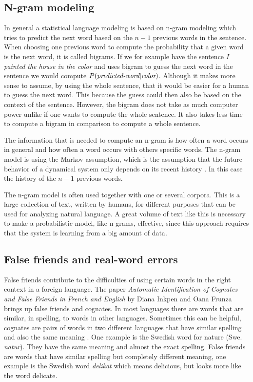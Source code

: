 \documentclass[a4paper,12pt]{article}
\begin{document}
\subsection{N-gram modeling}
\label{sec:ngram}
In general a statistical language modeling is based on n-gram modeling which tries to predict the next word based on the $n-1$ previous words in the sentence\cite{gallagher2004natural}.  When choosing one previous word to compute the probability that a given word is the next word, it is called bigrams. If we for example have the sentence \emph{I painted the house in the color} and uses bigram to guess the next word in the sentence we would compute $P(\emph{predicted-word}| \emph{color})$. Although it makes more sense to assume, by using the whole sentence, that it would be easier for a human to guess the next word. This because the guess could then also be based on the context of the sentence. However, the bigram does not take as much computer power unlike if one wants to compute the whole sentence. It also takes less time to compute a bigram in comparison to compute a whole sentence\cite{gallagher2004natural}.

The information that is needed to compute an n-gram is how often a word occurs in general and how often a word occurs with others specific words. The n-gram model is using the Markov assumption, which is the assumption that the future behavior of a dynamical system only depends on its recent history \cite{mooneynatural}. In this case the history of the $n-1$ previous words. 

The n-gram model is often used together with one or several corpora. This is a large collection of text, written by humans, for different purposes that can be used for analyzing natural language. A great volume of text like this is necessary to make a probabilistic model, like n-grams, effective, since this approach requires that the system is learning from a big amount of data\cite{RussellNorvigAIBook}.

\subsection{False friends and real-word errors}
False friends contribute to the difficulties of using certain words in the right context in a foreign language. The paper \emph{Automatic Identification of Cognates and False Friends in French and English} by Diana Inkpen and Oana Frunza brings up false friends and cognates. In most languages there are words that are similar, in spelling, to words in other languages. Sometimes this can be helpful, cognates are pairs of words in two different languages that have similar spelling and also the same meaning \cite{inkpen2005automatic}. One example is the Swedish word for nature (Swe. \emph{natur}). They have the same meaning and almost the exact spelling. False friends are words that have similar spelling but completely different meaning, one example is the Swedish word \emph{delikat} which means delicious, but looks more like the word delicate.
\end{document}
